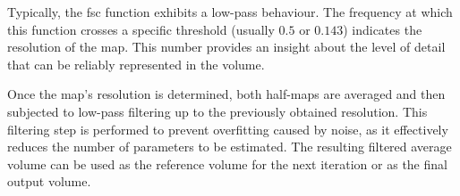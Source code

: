 \documentclass[../main.tex]{subfiles}
\begin{document}
Typically, the \gls{fsc} function exhibits a low-pass behaviour. The frequency at which this function crosses a specific threshold (usually $0.5$ or $0.143$) indicates the resolution of the map. This number provides an insight about the level of detail that can be reliably represented in the volume.

Once the map's resolution is determined, both half-maps are averaged and then subjected to low-pass filtering up to the previously obtained resolution. This filtering step is performed to prevent overfitting caused by noise, as it effectively reduces the number of parameters to be estimated\cite{scheres2012}. The resulting filtered average volume can be used as the reference volume for the next iteration or as the final output volume.
\end{document}
